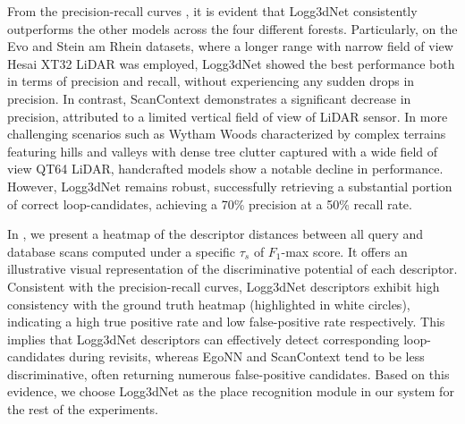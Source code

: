 From the precision-recall curves , it is evident that Logg3dNet consistently outperforms the other models across the four different forests. Particularly, on the Evo and Stein am Rhein datasets, where a longer range with narrow field of view Hesai XT32 LiDAR was employed, Logg3dNet showed the best performance both in terms of precision and recall, without experiencing any sudden drops in precision.
In contrast, ScanContext demonstrates a significant decrease in precision, attributed to a limited vertical field of view of LiDAR sensor. In more challenging scenarios such as Wytham Woods characterized by complex terrains featuring hills and valleys with dense tree clutter captured with a wide field of view QT64 LiDAR, handcrafted models show a notable decline in performance. However, Logg3dNet remains robust, successfully retrieving a substantial portion of correct loop-candidates, achieving a 70\% precision at a 50\% recall rate. 


In , we present a heatmap of the descriptor distances between all query and database scans computed under a specific $\tau_{s}$ of  $F_1$-max score. It offers an illustrative visual representation of the discriminative potential of each descriptor. Consistent with the precision-recall curves, Logg3dNet descriptors exhibit high consistency with the ground truth heatmap (highlighted in white circles), indicating a high true positive rate and low false-positive rate respectively. This implies that Logg3dNet descriptors can effectively detect corresponding loop-candidates during revisits, whereas EgoNN and ScanContext tend to be less discriminative, often returning numerous false-positive candidates.  Based on this evidence, we choose Logg3dNet as the place recognition module in our system for the rest of the experiments.


